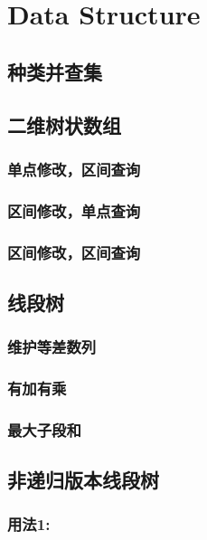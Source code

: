 \documentclass[twocolumn,a4paper]{article}  %
\begin{document}
\section{Data Structure}
\subsection{种类并查集}

\subsection{二维树状数组}
\subsubsection{单点修改，区间查询}

\subsubsection{区间修改，单点查询}

\subsubsection{区间修改，区间查询}

\subsection{线段树}
\subsubsection{维护等差数列}

\subsubsection{有加有乘}

\subsubsection{最大子段和}

\subsection{非递归版本线段树}

\subsubsection{用法1:}

\end{document}
